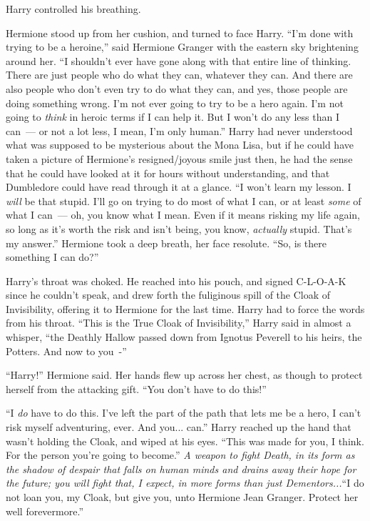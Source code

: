 Harry controlled his breathing.

Hermione stood up from her cushion, and turned to face Harry. ``I'm done with trying to be a heroine,'' said Hermione Granger with the eastern sky brightening around her. ``I shouldn't ever have gone along with that entire line of thinking. There are just people who do what they can, whatever they can. And there are also people who don't even try to do what they can, and yes, those people are doing something wrong. I'm not ever going to try to be a hero again. I'm not going to \emph{think} in heroic terms if I can help it. But I won't do any less than I can~--- or not a lot less, I mean, I'm only human.'' Harry had never understood what was supposed to be mysterious about the Mona Lisa, but if he could have taken a picture of Hermione's resigned/joyous smile just then, he had the sense that he could have looked at it for hours without understanding, and that Dumbledore could have read through it at a glance. ``I won't learn my lesson. I \emph{will} be that stupid. I'll go on trying to do most of what I can, or at least \emph{some} of what I can~--- oh, you know what I mean. Even if it means risking my life again, so long as it's worth the risk and isn't being, you know, \emph{actually} stupid. That's my answer.'' Hermione took a deep breath, her face resolute. ``So, is there something I can do?''

Harry's throat was choked. He reached into his pouch, and signed C-L-O-A-K since he couldn't speak, and drew forth the fuliginous spill of the Cloak of Invisibility, offering it to Hermione for the last time. Harry had to force the words from his throat. ``This is the True Cloak of Invisibility,'' Harry said in almost a whisper, ``the Deathly Hallow passed down from Ignotus Peverell to his heirs, the Potters. And now to you~-''

``Harry!'' Hermione said. Her hands flew up across her chest, as though to protect herself from the attacking gift. ``You don't have to do this!''

``I \emph{do} have to do this. I've left the part of the path that lets me be a hero, I can't risk myself adventuring, ever. And you... can.'' Harry reached up the hand that wasn't holding the Cloak, and wiped at his eyes. ``This was made for you, I think. For the person you're going to become.'' \emph{A weapon to fight Death, in its form as the shadow of despair that falls on human minds and drains away their hope for the future; you will fight that, I expect, in more forms than just Dementors...}``I do not loan you, my Cloak, but give you, unto Hermione Jean Granger. Protect her well forevermore.''

